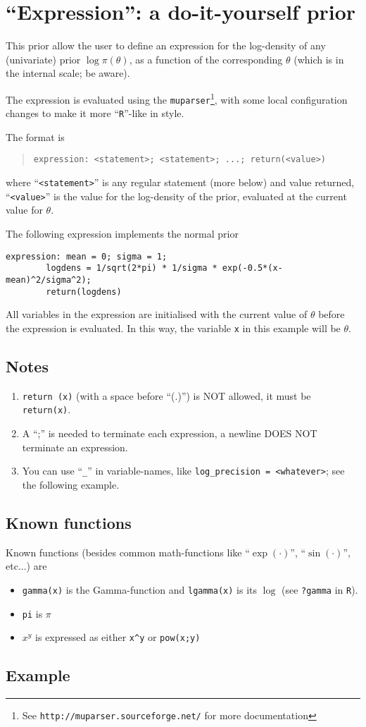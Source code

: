 \documentclass[a4paper,11pt]{article}
\begin{document}
\section*{``Expression'': a do-it-yourself prior}

This prior allow the user to define an expression for the log-density
of any (univariate) prior $\log\pi(\theta)$, as a function of the
corresponding $\theta$ (which is in the internal scale; be aware).

The expression is evaluated using the \texttt{muparser}\footnote{See
    \texttt{http://muparser.sourceforge.net/} for more documentation},
with some local configuration changes to make it more
``\texttt{R}''-like in style.

The format is
\begin{quote}
    \texttt{expression: <statement>; <statement>; ...; return(<value>)}
\end{quote}
where ``\texttt{<statement>}'' is any regular statement (more below)
and value returned, ``\texttt{<value>}'' is the value for the
log-density of the prior, evaluated at the current value for $\theta$.

The following expression implements the normal prior
\begin{verbatim}
expression: mean = 0; sigma = 1;
        logdens = 1/sqrt(2*pi) * 1/sigma * exp(-0.5*(x-mean)^2/sigma^2);
        return(logdens)
\end{verbatim}
All variables in the expression are initialised with the current value
of $\theta$ before the expression is evaluated. In this way, the
variable \verb|x| in this example will be $\theta$.

\subsection*{Notes}
\begin{enumerate}
\item \verb|return (x)| (with a space before ``(.)'') is NOT allowed,
    it must be \verb|return(x)|.
\item A ``;'' is needed to terminate each expression, a newline DOES
    NOT terminate an expression.
\item You can use ``\verb|_|'' in variable-names, like
    \verb|log_precision = <whatever>|; see the following example.
\end{enumerate}

\subsection*{Known functions}
Known functions (besides common math-functions like ``$\exp(\cdot)$'',
``$\sin(\cdot)$'', etc...) are
\begin{itemize}
\item \verb|gamma(x)| is the Gamma-function and \verb|lgamma(x)| is
    its $\log$ (see \verb|?gamma| in \verb|R|).
\item \verb|pi| is $\pi$
\item $x^y$ is expressed as either \verb|x^y| or \verb|pow(x;y)|
\end{itemize}

\subsection*{Example}

\end{document}
